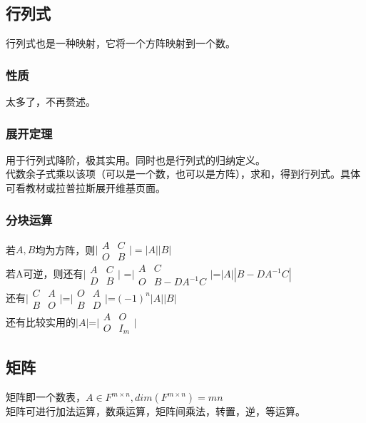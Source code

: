 \documentclass[UTF8]{ctexart}
\begin{document}
\subsection{行列式}
行列式也是一种映射，它将一个方阵映射到一个数。\\
\indent
\subsubsection{性质}
太多了，不再赘述。
\subsubsection{展开定理}
用于行列式降阶，极其实用。同时也是行列式的归纳定义。\\
\indent
代数余子式乘以该项（可以是一个数，也可以是方阵），求和，得到行列式。具体可看教材或拉普拉斯展开维基页面。
\subsubsection{分块运算}
若$A,B$均为方阵，则$\bigl| \begin{smallmatrix} A & C \\ \mathit{O} & B \end{smallmatrix} \bigr|=|A||B|$\\
\indent
若A可逆，则还有$\bigl | \begin{smallmatrix}A&C \\ D&B\end{smallmatrix}\bigr |$ =$\bigl | \begin{smallmatrix}A&C\\\mathit{O}&B-DA^{-1}C \end{smallmatrix}\bigr|$=$|A||B-DA^{-1}C|$\\
\indent
还有$\bigl | \begin{smallmatrix}C&A\\B&\mathit{O}\end{smallmatrix}\bigr |$=$\bigl | \begin{smallmatrix}\mathit{O}&A\\B&D \end{smallmatrix}\bigr |$=$(-1)^{n}|A||B|$\\
\indent
还有比较实用的$|A|$=$\bigl | \begin{smallmatrix}A&\mathit{O}\\\mathit{O}&I_{m}\end{smallmatrix}\bigr |$
\subsection{矩阵}
矩阵即一个数表，$A\in F^{m\times n},dim(F^{m\times n})=mn$\\
\indent
矩阵可进行加法运算，数乘运算，矩阵间乘法，转置，逆，等运算。
\end{document}
